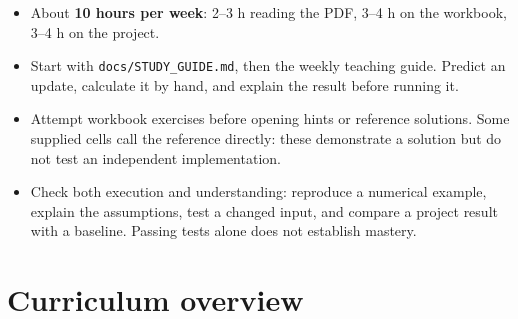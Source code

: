 \documentclass[11pt,oneside]{scrbook}
\begin{document}
\begin{itemize}
  \item About \textbf{10 hours per week}: 2--3 h reading the PDF, 3--4 h on the workbook, 3--4 h on the project.
  \item Start with \texttt{docs/STUDY\_GUIDE.md}, then the
        weekly teaching guide. Predict an update, calculate it by hand, and
        explain the result before running it.
  \item Attempt workbook exercises before opening hints or reference solutions.
        Some supplied cells call the reference directly: these demonstrate a
        solution but do not test an independent implementation.
  \item Check both execution and understanding: reproduce a numerical example,
        explain the assumptions, test a changed input, and compare a project
        result with a baseline. Passing tests alone does not establish mastery.
\end{itemize}

\chapter{Curriculum overview}
\end{document}
